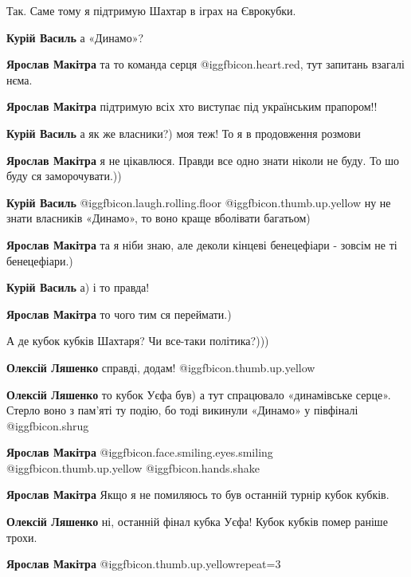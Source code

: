 \begin{itemize}
Так. Саме тому я підтримую Шахтар в іграх на Єврокубки.

\begin{itemize} %
\textbf{Курій Василь} а «Динамо»?

\textbf{Ярослав Макітра} та то команда серця @igg{fbicon.heart.red}, тут запитань взагалі нєма.

\textbf{Ярослав Макітра} підтримую всіх хто виступає під українським прапором!!

\textbf{Курій Василь} а як же власники?) моя теж! То я в продовження розмови

\textbf{Ярослав Макітра} я не цікавлюся. Правди все одно знати ніколи не буду. То шо буду ся заморочувати.))

\textbf{Курій Василь}  @igg{fbicon.laugh.rolling.floor}  @igg{fbicon.thumb.up.yellow}  ну не знати власників «Динамо», то воно краще вболівати багатьом)

\textbf{Ярослав Макітра} та я ніби знаю, але деколи кінцеві бенецефіари - зовсім не ті бенецефіари.)

\textbf{Курій Василь} а) і то правда!

\textbf{Ярослав Макітра} то чого тим ся переймати.)
\end{itemize} %

А де кубок кубків Шахтаря? Чи все-таки політика?)))

\begin{itemize} %
\textbf{Олексій Ляшенко} справді, додам!  @igg{fbicon.thumb.up.yellow} 

\textbf{Олексій Ляшенко} то кубок Уєфа був) а тут спрацювало «динамівське серце». Стерло воно з пам’яті ту подію, бо тоді викинули «Динамо» у півфіналі  @igg{fbicon.shrug} 

\textbf{Ярослав Макітра}  @igg{fbicon.face.smiling.eyes.smiling}  @igg{fbicon.thumb.up.yellow}  @igg{fbicon.hands.shake} 

\textbf{Ярослав Макітра} Якщо я не помиляюсь то був останній турнір кубок кубків.

\textbf{Олексій Ляшенко} ні, останній фінал кубка Уєфа! Кубок кубків помер раніше трохи.

\textbf{Ярослав Макітра}  @igg{fbicon.thumb.up.yellow}{repeat=3} 
\end{itemize} %


\end{itemize}
